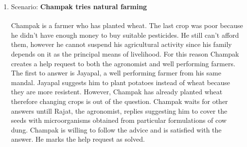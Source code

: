 \begin{enumerate}
\item Scenario: \textbf{Champak tries natural farming}\\\\
Champak is a farmer who has planted wheat. The last crop was poor because he didn't have enough money to buy suitable pesticides. He still can't afford them, however he cannot suspend his agricultural activity since his family depends on it as the principal means of livelihood. For this reason Champak creates a help request to both the agronomist and well performing farmers. The first to answer is Jayapal, a well performing farmer from his same mandal. Jayapal suggests him to plant potatoes instead of wheat because they are more resistent. However, Champak has already planted wheat therefore changing crops is out of the question. Champak waits for other answers untill Rajat, the agronomist, replies suggesting him to cover the seeds with microorganisms obtained from particular formulations of cow dung. Champak is willing to follow the advice and is satisfied with the answer. He marks the help request as solved. 
\\


\end{enumerate}
